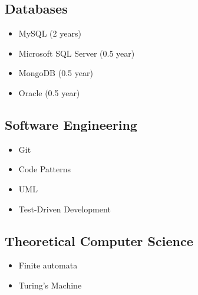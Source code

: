 \documentclass[a4paper,12pt]{article}
\begin{document}
\subsection*{Databases}

\begin{multicols}{2}
\begin{itemize}
    \item MySQL (2 years)
    \item Microsoft SQL Server (0.5 year)
    \item MongoDB (0.5 year)
    \item Oracle (0.5 year)
\end{itemize}
\end{multicols}

\subsection*{Software Engineering}

\begin{multicols}{2}
\begin{itemize}
    \item Git
    \item Code Patterns
    \item UML
    \item Test-Driven Development 
\end{itemize}
\end{multicols}

\subsection*{Theoretical Computer Science}

\begin{multicols}{2}

\begin{itemize}
    \item Finite automata
    \item Turing's Machine
\end{itemize}

\end{multicols}
\end{document}
